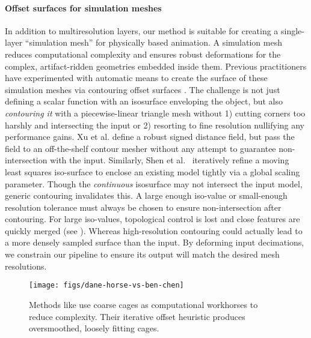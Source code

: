 \paragraph{Offset surfaces for simulation meshes}
In addition to multiresolution layers, our method is suitable for creating a
single-layer ``simulation mesh'' for physically based animation.
%
A simulation mesh reduces computational complexity and ensures robust
deformations for the complex, artifact-ridden geometries embedded inside them.
%
Previous practitioners have experimented with automatic means to create the
surface of these simulation meshes via contouring offset surfaces
\cite{Campen:2010}.
%
The challenge is not just defining a scalar function with an isosurface
enveloping the object, but also \emph{contouring it} with a piecewise-linear
triangle mesh without 1) cutting corners too harshly and intersecting the input
or 2) resorting to fine resolution nullifying any performance gains.
%
Xu et al.  define a robust signed distance field, but
pass the field to an off-the-shelf contour mesher without any attempt to
guarantee non-intersection with the input.
%
Similarly, Shen et al.\  iteratively refine a moving
least squares iso-surface to enclose an existing model tightly via a global
scaling parameter. Though the \emph{continuous}
isosurface may not intersect the input model, generic contouring invalidates
this.
%
A large enough iso-value or small-enough resolution tolerance must always be
chosen to ensure non-intersection after contouring.
%
For large iso-values, topological control is lost and close features are
quickly merged (see ).
%
Whereas high-resolution contouring could actually lead to a more densely sampled
surface than the input.
%
By deforming input decimations, we constrain our pipeline to ensure its output
will match the desired mesh resolutions. 

\begin{figure}
  \texttt{[image: figs/dane-horse-vs-ben-chen]}
  \caption{Methods like \protect\cite{Ben-Chen:2009:SDT} use coarse cages as
  computational workhorses to reduce complexity. Their iterative offset
  heuristic produces oversmoothed, loosely fitting cages.}
  \label{fig:dane-vs-ben-chen}
\end{figure}

